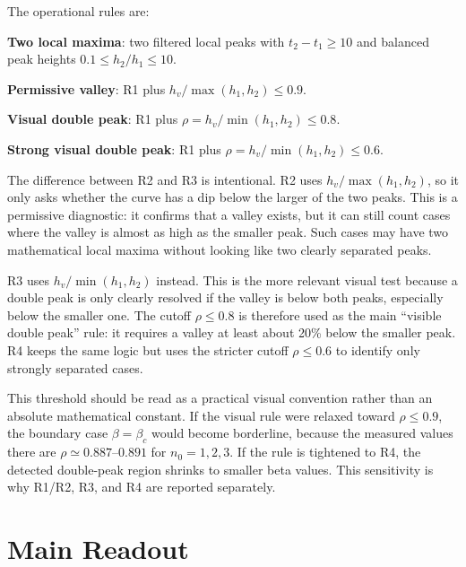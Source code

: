 \documentclass[10pt]{article}
\begin{document}
The operational rules are:
\begin{description}[style=nextline,leftmargin=1.3cm,labelwidth=1.1cm]
  \item[R1] \textbf{Two local maxima}: two filtered local peaks with
  $t_2-t_1\geq10$ and balanced peak heights
  $0.1\leq h_2/h_1\leq10$.
  \item[R2] \textbf{Permissive valley}: R1 plus
  $h_v/\max(h_1,h_2)\leq0.9$.
  \item[R3] \textbf{Visual double peak}: R1 plus
  $\rho=h_v/\min(h_1,h_2)\leq0.8$.
  \item[R4] \textbf{Strong visual double peak}: R1 plus
  $\rho=h_v/\min(h_1,h_2)\leq0.6$.
\end{description}

The difference between R2 and R3 is intentional.  R2 uses
$h_v/\max(h_1,h_2)$, so it only asks whether the curve has a dip below the
larger of the two peaks.  This is a permissive diagnostic: it confirms that a
valley exists, but it can still count cases where the valley is almost as high
as the smaller peak.  Such cases may have two mathematical local maxima without
looking like two clearly separated peaks.

R3 uses $h_v/\min(h_1,h_2)$ instead.  This is the more relevant visual test
because a double peak is only clearly resolved if the valley is below both
peaks, especially below the smaller one.  The cutoff $\rho\leq0.8$ is therefore
used as the main ``visible double peak'' rule: it requires a valley at least
about 20\% below the smaller peak.  R4 keeps the same logic but uses the
stricter cutoff $\rho\leq0.6$ to identify only strongly separated cases.

This threshold should be read as a practical visual convention rather than an
absolute mathematical constant.  If the visual rule were relaxed toward
$\rho\leq0.9$, the boundary case $\beta=\beta_c$ would become borderline,
because the measured values there are $\rho\simeq0.887$--$0.891$ for
$n_0=1,2,3$.  If the rule is tightened to R4, the detected double-peak region
shrinks to smaller beta values.  This sensitivity is why R1/R2, R3, and R4 are
reported separately.

\section*{Main Readout}
\begin{table}[!htbp]
  \centering
  \caption{Summary of the fixed-shortcut sweep.  ``Double at/above
  $\beta_c$'' counts grid points satisfying the R3 visual double-peak rule and
  $\beta\geq0.04$.}
  
\end{table}
\end{document}
